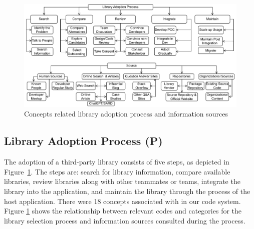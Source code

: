 


\begin{figure}
    \centering
    \includegraphics[scale=0.78]{images/process.pdf}
    \caption{Concepts related library adoption process and information sources}
    \label{fig:process}
\end{figure}

\subsection{Library Adoption Process (P)}\label{sec:phases} 
The adoption of a third-party library consists of five steps, as depicted in Figure~\ref{fig:process}. The steps are: search for library information, compare available libraries, review libraries along with other teammates or teams, integrate the library into the application, and maintain the library through the process of the host application. There were 18 concepts associated with  in our code system. Figure \ref{fig:process} shows the relationship between relevant codes and categories for the library selection process and information sources consulted during the process.

